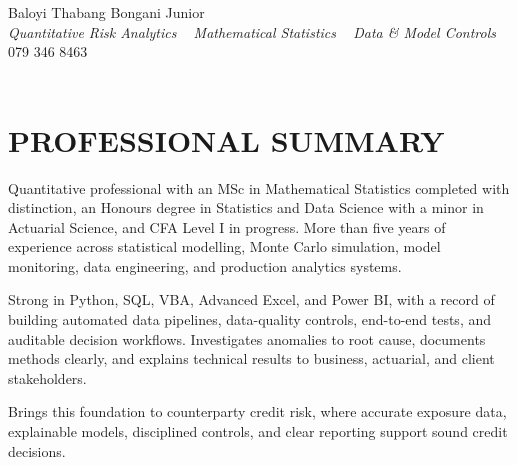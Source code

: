 \documentclass[letterpaper,11pt]{article}
\begin{document}


\begin{center}
    {\huge Baloyi Thabang Bongani Junior} \\ \vspace{2pt}
    {\large\textit{Quantitative Risk Analytics \textbar~ Mathematical Statistics \textbar~ Data \& Model Controls}} \\ \vspace{4pt}
    {079 346 8463} ~\textbar~
    \href{mailto:Baloyibongani1@gmail.com}{\color{blue}{Baloyibongani1@gmail.com}} \\ \vspace{1pt}
    \href{https://www.linkedin.com/in/thabang-bongani-junior-baloyi-2622b0286/}{\color{blue}{linkedin.com/in/thabang-bongani-junior-baloyi}} ~\textbar~
    \href{https://github.com/thabangTheActuaryCoder}{\color{blue}{github.com/thabangTheActuaryCoder}}
    \vspace{-7pt}
\end{center}

\section{PROFESSIONAL SUMMARY}
\vspace{4pt}
{\small
\noindent
Quantitative professional with an MSc in Mathematical Statistics completed with distinction,
an Honours degree in Statistics and Data Science with a minor in Actuarial Science, and CFA
Level I in progress. More than five years of experience across statistical modelling, Monte Carlo
simulation, model monitoring, data engineering, and production analytics systems.

\vspace{4pt}

\noindent
Strong in Python, SQL, VBA, Advanced Excel, and Power BI, with a record of building automated
data pipelines, data-quality controls, end-to-end tests, and auditable decision workflows.
Investigates anomalies to root cause, documents methods clearly, and explains technical results
to business, actuarial, and client stakeholders.

\vspace{4pt}

\noindent
Brings this foundation to counterparty credit risk, where accurate exposure data, explainable
models, disciplined controls, and clear reporting support sound credit decisions.
}
\vspace{-2pt}
\end{document}
